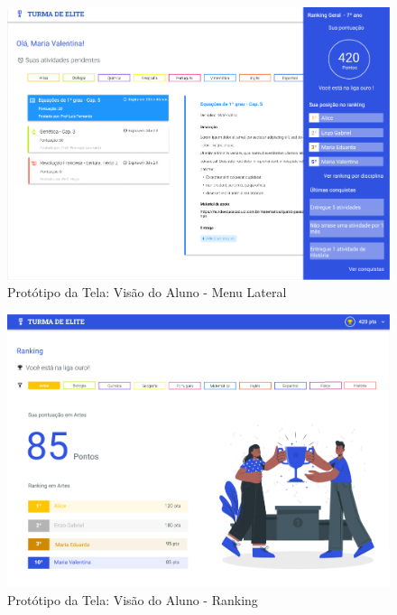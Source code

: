 \begin{apendicesenv}
\begin{figure}[htb]
    \centering
	\includegraphics[width=16cm]{imagens/Aluno-MenuLateral.png}
	\caption{\label{fig:menu-lateral} Protótipo da Tela: Visão do Aluno - Menu Lateral}
\end{figure}
\FloatBarrier

\begin{figure}[htb]
    \centering
	\includegraphics[width=16cm]{imagens/Aluno-Ranking.png}
	\caption{\label{fig:ranking} Protótipo da Tela: Visão do Aluno - Ranking}
\end{figure}
\FloatBarrier


\end{apendicesenv}
